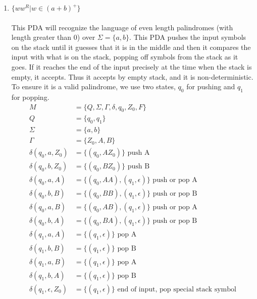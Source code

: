 \documentclass[10pt,a4paper,final]{article}
\begin{document}
\begin{enumerate}
\begin{enumerate}
  \item %
  $\{ww^R|w \in (a+b)^+\}$ \\
  \\
  This PDA will recognize the language of even length palindromes (with length greater than 0)
  over $\Sigma = \{a,b\}$. This PDA pushes the input symbols on the stack until it guesses that it is
  in the middle and then it compares the input with what is on the stack, popping off symbols from the
  stack as it goes. If it reaches the end of the input precisely at the time when the stack is empty,
  it accepts. Thus it accepts by empty stack, and it is non-deterministic. To ensure it is a valid
  palindrome, we use two states, $q_0$ for pushing and $q_1$ for popping.
  \begin{align*}
    M &= \{Q, \Sigma, \Gamma, \delta, q_0, Z_0, F\} \\
    Q &= \{q_0, q_1\} \\
    \Sigma &= \{a, b\} \\
    \Gamma &= \{Z_0, A, B\} \\
    \delta(q_0, a, Z_0) &= \{(q_0, AZ_0)\} \mbox{ push A} \\
    \delta(q_0, b, Z_0) &= \{(q_0, BZ_0)\} \mbox{ push B} \\
    \delta(q_0, a, A) &= \{(q_0, AA), (q_1, \epsilon)\} \mbox{ push or pop A} \\
    \delta(q_0, b, B) &= \{(q_0, BB), (q_1, \epsilon)\} \mbox{ push or pop B} \\
    \delta(q_0, a, B) &= \{(q_0, AB), (q_1, \epsilon)\} \mbox{ push or pop A} \\
    \delta(q_0, b, A) &= \{(q_0, BA), (q_1, \epsilon)\} \mbox{ push or pop B} \\
    \delta(q_1, a, A) &= \{(q_1, \epsilon)\} \mbox{ pop A} \\
    \delta(q_1, b, B) &= \{(q_1, \epsilon)\} \mbox{ pop B} \\
    \delta(q_1, a, B) &= \{(q_1, \epsilon)\} \mbox{ pop A} \\
    \delta(q_1, b, A) &= \{(q_1, \epsilon)\} \mbox{ pop B} \\
    \delta(q_1, \epsilon, Z_0) &= \{(q_1, \epsilon)\} \mbox{ end of input, pop special stack symbol}
  \end{align*}
\end{enumerate}
  

\end{enumerate}
\end{document}
